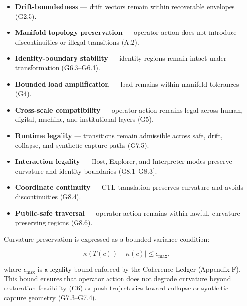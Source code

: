 \begin{itemize}
    \item \textbf{Drift-boundedness} — drift vectors remain within recoverable
    envelopes (G2.5).

    \item \textbf{Manifold topology preservation} — operator action does not
    introduce discontinuities or illegal transitions (A.2).

    \item \textbf{Identity-boundary stability} — identity regions remain intact
    under transformation (G6.3--G6.4).

    \item \textbf{Bounded load amplification} — load remains within manifold
    tolerances (G4).

    \item \textbf{Cross-scale compatibility} — operator action remains legal
    across human, digital, machine, and institutional layers (G5).

    \item \textbf{Runtime legality} — transitions remain admissible across safe,
    drift, collapse, and synthetic-capture paths (G7.5).

    \item \textbf{Interaction legality} — Host, Explorer, and Interpreter modes
    preserve curvature and identity boundaries (G8.1--G8.3).

    \item \textbf{Coordinate continuity} — CTL translation preserves curvature
    and avoids discontinuities (G8.4).

    \item \textbf{Public-safe traversal} — operator action remains within lawful,
    curvature-preserving regions (G8.6).
\end{itemize}

\medskip

\noindent Curvature preservation is expressed as a bounded variance condition:



\[
|\kappa(T(c)) - \kappa(c)| \le \epsilon_{\max},
\]



\noindent where $\epsilon_{\max}$ is a legality bound enforced by the Coherence
Ledger (Appendix F). This bound ensures that operator action does not degrade
curvature beyond restoration feasibility (G6) or push trajectories toward
collapse or synthetic-capture geometry (G7.3--G7.4).

